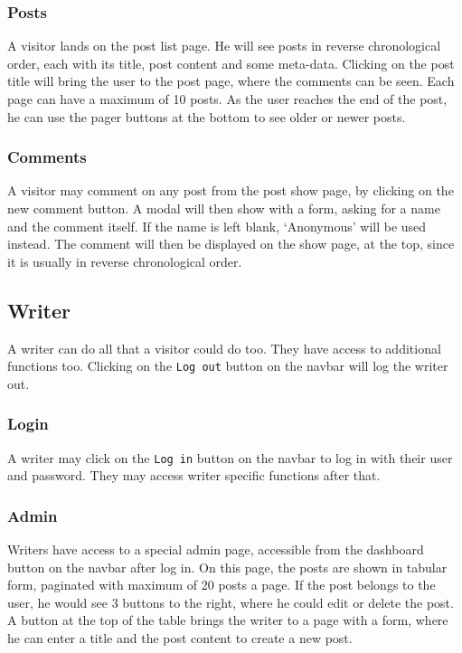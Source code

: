 \documentclass[12pt]{article}
\begin{document}
\subsubsection*{Posts}

A visitor lands on the post list page. He will see posts in reverse chronological order, each with its title, post content and some meta-data. Clicking on the post title will bring the user to the post page, where the comments can be seen. Each page can have a maximum of 10 posts. As the user reaches the end of the post, he can use the pager buttons at the bottom to see older or newer posts.

\subsubsection*{Comments}

A visitor may comment on any post from the post show page, by clicking on the new comment button. A modal will then show with a form, asking for a name and the comment itself. If the name is left blank, `Anonymous' will be used instead. The comment will then be displayed on the show page, at the top, since it is usually in reverse chronological order.

\subsection*{Writer}

A writer can do all that a visitor could do too. They have access to additional functions too. Clicking on the \texttt{Log out} button on the navbar will log the writer out.

\subsubsection*{Login}

A writer may click on the \texttt{Log in} button on the navbar to log in with their user and password. They may access writer specific functions after that.

\subsubsection*{Admin}

Writers have access to a special admin page, accessible from the dashboard button on the navbar after log in. On this page, the posts are shown in tabular form, paginated with maximum of 20 posts a page. If the post belongs to the user, he would see 3 buttons to the right, where he could edit or delete the post. A button at the top of the table brings the writer to a page with a form, where he can enter a title and the post content to create a new post.
\end{document}
